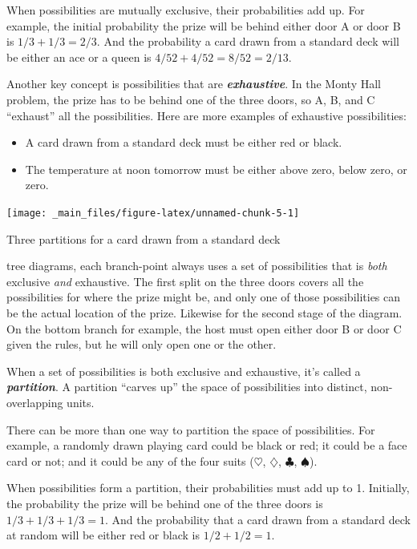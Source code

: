 \documentclass[justified]{tufte-book}
\providecommand{\tightlist}{%
  \setlength{\itemsep}{0pt}\setlength{\parskip}{0pt}}
\begin{document}
When possibilities are mutually exclusive, their probabilities add up. For example, the initial probability the prize will be behind either door A or door B is \(1/3 + 1/3 = 2/3\). And the probability a card drawn from a standard deck will be either an ace or a queen is \(4/52 + 4/52 = 8/52 = 2/13\).

Another key concept is possibilities that are \textbf{\emph{exhaustive}}. In the Monty Hall problem, the prize has to be behind one of the three doors, so A, B, and C ``exhaust'' all the possibilities. Here are more examples of exhaustive possibilities:

\begin{itemize}
\tightlist
\item
  A card drawn from a standard deck must be either red or black.
\item
  The temperature at noon tomorrow must be either above zero, below zero, or zero.
\end{itemize}

\begin{marginfigure}
\texttt{[image: \_main\_files/figure-latex/unnamed-chunk-5-1]} \caption[Three  partitions for a card drawn from a standard deck]{Three  partitions for a card drawn from a standard deck}\label{fig:unnamed-chunk-5}
\end{marginfigure}

 tree diagrams, each branch-point always uses a set of possibilities that is \emph{both} exclusive \emph{and} exhaustive. The first split on the three doors covers all the possibilities for where the prize might be, and only one of those possibilities can be the actual location of the prize. Likewise for the second stage of the diagram. On the bottom branch for example, the host must open either door B or door C given the rules, but he will only open one or the other.

When a set of possibilities is both exclusive and exhaustive, it's called a \textbf{\emph{partition}}. A partition ``carves up'' the space of possibilities into distinct, non-overlapping units.

There can be more than one way to partition the space of possibilities. For example, a randomly drawn playing card could be black or red; it could be a face card or not; and it could be any of the four suits (\(\heartsuit\), \(\diamondsuit\), \(\clubsuit\), \(\spadesuit\)).

When possibilities form a partition, their probabilities must add up to 1. Initially, the probability the prize will be behind one of the three doors is \(1/3 + 1/3 + 1/3 = 1\). And the probability that a card drawn from a standard deck at random will be either red or black is \(1/2 + 1/2 = 1\).
\end{document}
